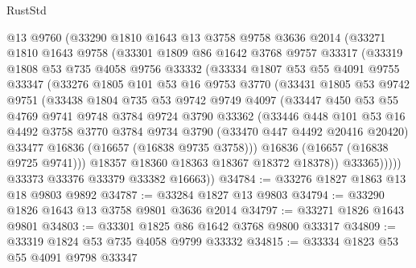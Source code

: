 \begin{lexlean}{RustStd}
\begin{coremodule}
      @13
      @9760
      (@33290
        @1810
        @1643
        @13
        @3758
        @9758
        @3636
        @2014
        (@33271
          @1810
          @1643
          @9758
          (@33301
            @1809
            @86
            @1642
            @3768
            @9757
            @33317
            (@33319
              @1808
              @53
              @735
              @4058
              @9756
              @33332
              (@33334
                @1807
                @53
                @55
                @4091
                @9755
                @33347
                (@33276
                  @1805
                  @101
                  @53
                  @16
                  @9753
                  @3770
                  (@33431
                    @1805
                    @53
                    @9742
                    @9751
                    (@33438
                      @1804
                      @735
                      @53
                      @9742
                      @9749
                      @4097
                      (@33447
                        @450
                        @53
                        @55
                        @4769
                        @9741
                        @9748
                        @3784
                        @9724
                        @3790
                        @33362
                        (@33446
                          @448
                          @101
                          @53
                          @16
                          @4492
                          @3758
                          @3770
                          @3784
                          @9734
                          @3790
                          (@33470 @447 @4492 @20416 @20420)
                          @33477
                          @16836
                          (@16657 (@16838 @9735 @3758)))
                        @16836
                        (@16657 (@16838 @9725 @9741)))
                      @18357
                      @18360
                      @18363
                      @18367
                      @18372
                      @18378))
                  @33365)))))
        @33373
        @33376
        @33379
        @33382
        @16663))
@34784 := @33276 @1827 @1863 @13 @18 @9803 @9892
@34787 := @33284 @1827 @13 @9803
@34794 := @33290 @1826 @1643 @13 @3758 @9801 @3636 @2014
@34797 := @33271 @1826 @1643 @9801
@34803 := @33301 @1825 @86 @1642 @3768 @9800 @33317
@34809 := @33319 @1824 @53 @735 @4058 @9799 @33332
@34815 := @33334 @1823 @53 @55 @4091 @9798 @33347

\end{coremodule}
\end{lexlean}
